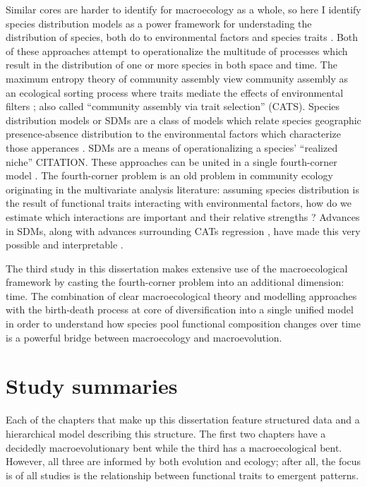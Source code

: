Similar cores are harder to identify for macroecology as a whole, so here I identify species distribution models as a power framework for understading the distribution of species, both do to environmental factors \citep{Elith2009} and species traits \citep{Shipley2006}. Both of these approaches attempt to operationalize the multitude of processes which result in the distribution of one or more species in both space and time. The maximum entropy theory of community assembly view community assembly as an ecological sorting process where traits mediate the effects of environmental filters \citep{Shipley2006,Warton2015a}; also called ``community assembly via trait selection'' (CATS). Species distribution models or SDMs are a class of models which relate species geographic presence-absence distribution to the environmental factors which characterize those apperances \citep{Elith2009,Austin2006,Phillips2006a}. SDMs are a means of operationalizing a species' ``realized niche'' CITATION. These approaches can be united in a single fourth-corner model \citep{Warton2015a,Brown2014c}. The fourth-corner problem is an old problem in community ecology originating in the multivariate analysis literature: assuming species distribution is the result of functional traits interacting with environmental factors, how do we estimate which interactions are important and their relative strengths \citep{Legendre1997,Dray2008}? Advances in SDMs, along with advances surrounding CATs regression \citep{Renner2013}, have made this very possible and interpretable \citep{Brown2014c,Jamil2013,Pollock2012,Pollock2015}.

The third study in this dissertation makes extensive use of the macroecological framework by casting the fourth-corner problem into an additional dimension: time. The combination of clear macroecological theory and modelling approaches with the birth-death process at core of diversification into a single unified model in order to understand how species pool functional composition changes over time is a powerful bridge between macroecology and macroevolution.



\section{Study summaries} 

Each of the chapters that make up this dissertation feature structured data and a hierarchical model describing this structure. The first two chapters have a decidedly macroevolutionary bent while the third has a macroecological bent. However, all three are informed by both evolution and ecology; after all, the focus is of all studies is the relationship between functional traits to emergent patterns.




